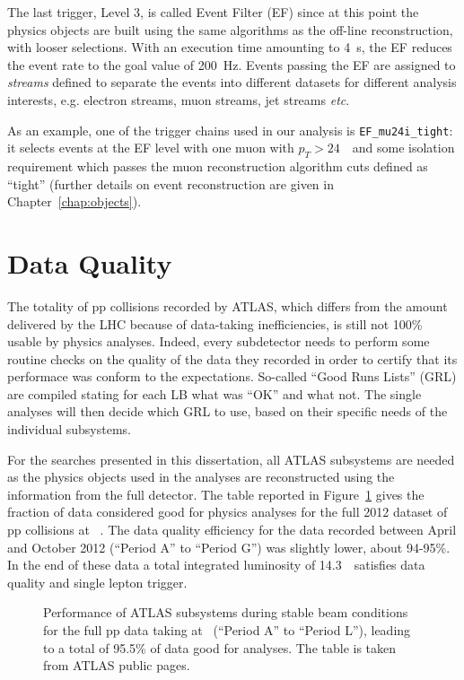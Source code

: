 The last trigger, Level 3, is called Event Filter (EF) since
at this point the physics objects are built using the same
algorithms as the off-line reconstruction, with looser selections. With an execution time
amounting to 4~s, the EF reduces the event rate to the goal value
of 200~Hz.
Events passing the EF are assigned to {\it streams} defined to separate
the events into different datasets for different analysis interests, e.g.
electron streams, muon streams, jet streams {\it etc}.

As an example, one of the trigger chains used in our analysis is 
\texttt{EF\_mu24i\_tight}: it selects events at the EF level with one 
muon with $p_T>24$~\gev\ and some isolation requirement which passes
the muon reconstruction algorithm cuts defined as ``tight''
(further details on event reconstruction are given in Chapter~\ref{chap:objects}).

\section{Data Quality}\label{sec:daq}

The totality of pp collisions recorded by ATLAS, which differs from the amount
delivered by the LHC because of data-taking inefficiencies, is still
not 100\% usable by physics analyses. Indeed, every subdetector needs to
perform some routine checks %
on the quality of the data they recorded in order to certify that its performace
was conform to the expectations. So-called ``Good Runs Lists'' (GRL) are
compiled stating for each LB what was ``OK'' and what not.
The single analyses will then decide which GRL to use, based on their specific
needs of the individual subsystems.

For the searches presented in this dissertation, all ATLAS subsystems
are needed as the physics objects used in the analyses are reconstructed
using the information from the full detector.
The table reported in Figure~\ref{fig:dq2012}
gives the fraction of data considered good for physics analyses 
for the full 2012 dataset of pp collisions at ~\tev.
The data quality efficiency for the data 
recorded between April and October 2012 (``Period A'' to ``Period G'')
was slightly lower, about 94-95\%. In the end 
of these data a total
integrated luminosity of 14.3~\ifb\ 
satisfies data quality and single lepton trigger.

\begin{figure}[htb]\begin{center}
	\caption[bla]{Performance of ATLAS subsystems during stable beam conditions
        for the full pp data taking at \rts=8~\tev (``Period A'' to ``Period L''),
        leading to a total of 95.5\% of data good for analyses. The table is
        taken from ATLAS public pages\footnotemark.\label{fig:dq2012}}
\end{center}\end{figure}


